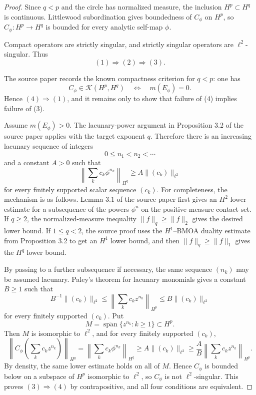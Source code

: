 \documentclass[11pt]{article}
\newcommand{\K}{\mathcal K}
\begin{document}
\begin{proof}
Since $q<p$ and the circle has normalized measure, the inclusion
$H^p\subset H^q$ is continuous.  Littlewood subordination gives boundedness of
$C_\phi$ on $H^p$, so $C_\phi:H^p\to H^q$ is bounded for every analytic
self-map $\phi$.

Compact operators are strictly singular, and strictly singular operators are
$\ell^2$-singular.  Thus
\[
        (1)\Rightarrow (2)\Rightarrow (3).
\]

The source paper records the known compactness criterion for $q<p$: one has
\[
        C_\phi\in\K(H^p,H^q)
        \quad\Longleftrightarrow\quad
        m(E_\phi)=0.
\]
Hence $(4)\Rightarrow(1)$, and it remains only to show that failure of (4)
implies failure of (3).

Assume $m(E_\phi)>0$.  The lacunary-power argument in Proposition 3.2 of the
source paper applies with the target exponent $q$.  Therefore there is an
increasing lacunary sequence of integers
\[
        0\le n_1<n_2<\cdots
\]
and a constant $A>0$ such that
\[
        \left\|\sum_k c_k \phi^{n_k}\right\|_{H^q}
        \ge A\|(c_k)\|_{\ell^2}
\]
for every finitely supported scalar sequence $(c_k)$.  For completeness, the
mechanism is as follows.  Lemma 3.1 of the source paper first gives an
$H^2$ lower estimate for a subsequence of the powers $\phi^n$ on the
positive-measure contact set.  If $q\ge2$, the normalized-measure inequality
$\|f\|_q\ge\|f\|_2$ gives the desired lower bound.  If $1\le q<2$, the
source proof uses the $H^1$--BMOA duality estimate from Proposition 3.2 to get
an $H^1$ lower bound, and then $\|f\|_q\ge\|f\|_1$ gives the $H^q$ lower
bound.

By passing to a further subsequence if necessary, the same sequence
$(n_k)$ may be assumed lacunary.  Paley's theorem for lacunary monomials gives
a constant $B\ge1$ such that
\[
        B^{-1}\|(c_k)\|_{\ell^2}
        \le
        \left\|\sum_k c_k z^{n_k}\right\|_{H^p}
        \le
        B\|(c_k)\|_{\ell^2}
\]
for every finitely supported $(c_k)$.  Put
\[
        M=\overline{\operatorname{span}}\{z^{n_k}:k\ge1\}\subset H^p.
\]
Then $M$ is isomorphic to $\ell^2$, and for every finitely supported
$(c_k)$,
\[
 \left\|C_\phi\left(\sum_k c_k z^{n_k}\right)\right\|_{H^q}
 =
 \left\|\sum_k c_k \phi^{n_k}\right\|_{H^q}
 \ge A\|(c_k)\|_{\ell^2}
 \ge \frac{A}{B}
       \left\|\sum_k c_k z^{n_k}\right\|_{H^p}.
\]
By density, the same lower estimate holds on all of $M$.  Hence $C_\phi$ is
bounded below on a subspace of $H^p$ isomorphic to $\ell^2$, so $C_\phi$ is
not $\ell^2$-singular.  This proves $(3)\Rightarrow(4)$ by contrapositive,
and all four conditions are equivalent.
\end{proof}
\end{document}
